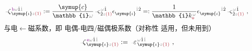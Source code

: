 \begin{align} \label{eq:m<-p}
	\Xint{\begin{smallmatrix} ~ \\ {}^{}_{\mathcolor{gray}{-}} \\ ~ \end{smallmatrix}}{12}{\zeta}^{\;\! \textcolor{Plum}{\text{b}} \mathcolor{gray}{\omega} \hat{1} \mathcolor{gray}{\dot{1}}}_{\;\! \symup{\iota} \mathcolor{gray}{z} \textcolor{Maroon}{(1)}} := \frac{\symup{c}}{\mathbb{i} \mathcolor{gray}{\omega}} \Xint{\begin{smallmatrix} ~ \\ {}^{}_{\mathcolor{gray}{-}} \\ ~ \end{smallmatrix}}{13}{\varsigma}^{\;\! \mathcolor{gray}{\omega} \hat{1}}_{\;\! \dot{2} \mathcolor{gray}{z} \textcolor{Maroon}{(1)}} \epsilon^{\hphantom{\symup{\iota}}\mathcolor{gray}{\dot{1}}\dot{2}}_{\symup{\iota}} =: \frac{1}{\mathbb{i} k_{\textcolor{Maroon}{\mathsf{o}}}^{\;\! \mathcolor{gray}{\omega}}} \epsilon^{\hphantom{\symup{\iota}}\mathcolor{gray}{\dot{1}}\dot{2}}_{\symup{\iota}} \Xint{\begin{smallmatrix} ~ \\ {}^{}_{\mathcolor{gray}{-}} \\ ~ \end{smallmatrix}}{13}{\varsigma}^{\;\! \mathcolor{gray}{\omega} \hat{1}}_{\;\! \dot{2} \mathcolor{gray}{z} \textcolor{Maroon}{(1)}} ~,
\end{align}
与\textcolor{NavyBlue}{电$\longleftarrow$磁}系数，即 \textcolor{NavyBlue}{电偶-电四/磁偶}极系数（对称性  适用，但未用到）
\begin{align} \label{eq:p<-q/m}
	\Xint{\begin{smallmatrix} ~ \\ {}^{}_{\mathcolor{gray}{-}} \\ ~ \end{smallmatrix}}{12}{\zeta}^{\;\! \textcolor{Plum}{\text{e}} \mathcolor{gray}{\omega} \hat{1} \mathcolor{gray}{\check{1}}}_{\;\! \symup{\iota} \mathcolor{gray}{z} \textcolor{Maroon}{(1)}} := \Xint{\begin{smallmatrix} ~ \\ {}^{}_{\mathcolor{gray}{-}} \\ ~ \end{smallmatrix}}{16}{\varepsilon}^{\;\! \mathcolor{gray}{\omega} \hat{1} \mathcolor{gray}{\check{1}}}_{\;\! \symup{\iota} \mathcolor{gray}{z} \textcolor{Maroon}{(1)}} ~,
\end{align}
